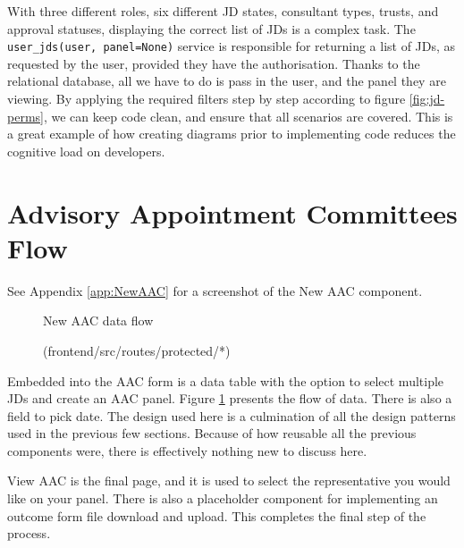 With three different roles, six different JD states, consultant types, trusts, and approval statuses, displaying the correct list of JDs is a complex task. The \texttt{user\_jds(user, panel=None)} service is responsible for returning a list of JDs, as requested by the user, provided they have the authorisation. Thanks to the relational database, all we have to do is pass in the user, and the panel they are viewing. By applying the required filters step by step according to figure \ref{fig:jd-perms}, we can keep code clean, and ensure that all scenarios are covered. This is a great example of how creating diagrams prior to implementing code reduces the cognitive load on developers.

\section{Advisory Appointment Committees Flow}
\vspace{-5pt}
{\footnotesize See Appendix \ref{app:NewAAC} for a screenshot of the New AAC component.}
\vspace{-5pt}
\begin{figure}[H]
\centering
{}
\vspace{-5pt}
\caption{New AAC data flow}
\vspace{-10pt}
\caption*{(frontend/src/routes/protected/*)}
\label{fig:aac-flow}
\vspace{-25pt}
\end{figure}

Embedded into the AAC form is a data table with the option to select multiple JDs and create an AAC panel. Figure \ref{fig:aac-flow} presents the flow of data. There is also a field to pick date. The design used here is a culmination of all the design patterns used in the previous few sections. Because of how reusable all the previous components were, there is effectively nothing new to discuss here.

View AAC is the final page, and it is used to select the representative you would like on your panel. There is also a placeholder component for implementing an outcome form file download and upload. This completes the final step of the process.

